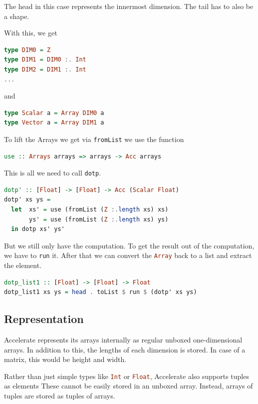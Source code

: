 \documentclass[a4paper,bibliography=totocnumbered,parskip,headsepline]{scrbook}
\begin{document}
The head in this case represents the innermost dimension.
The tail has to also be a shape.

With this, we get
\begin{lstlisting}[language=haskell]
type DIM0 = Z
type DIM1 = DIM0 :. Int
type DIM2 = DIM1 :. Int
...
\end{lstlisting}
and
\begin{lstlisting}[language=haskell]
type Scalar a = Array DIM0 a
type Vector a = Array DIM1 a
\end{lstlisting}

To lift the Arrays we get via \lstinline[language=haskell]!fromList! we use the function
\begin{lstlisting}[language=haskell]
use :: Arrays arrays => arrays -> Acc arrays
\end{lstlisting}

This is all we need to call \lstinline[language=haskell]!dotp!.

\begin{lstlisting}[language=haskell]
dotp' :: [Float] -> [Float] -> Acc (Scalar Float)
dotp' xs ys =
  let  xs' = use (fromList (Z :.length xs) xs)
       ys' = use (fromList (Z :.length xs) ys)
  in dotp xs' ys'
\end{lstlisting}

But we still only have the computation.
To get the result out of the computation, we have to \lstinline[language=haskell]!run! it.
After that we can convert the \lstinline[language=haskell]!Array! back to a list and extract the element.

\begin{lstlisting}[language=haskell]
dotp_list1 :: [Float] -> [Float] -> Float
dotp_list1 xs ys = head . toList $ run $ (dotp' xs ys)
\end{lstlisting}

\subsection{Representation}
Accelerate represents its arrays internally as regular unboxed one-dimensional arrays.
In addition to this, the lengths of each dimension is stored.
In case of a matrix, this would be height and width.

Rather than just simple types like \lstinline[language=haskell]!Int! or \lstinline[language=haskell]!Float!, Accelerate also supports tuples as elements
These cannot be easily stored in an unboxed array.
Instead, arrays of tuples are stored as tuples of arrays.
\end{document}

